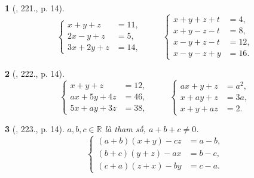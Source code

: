 \documentclass{article}
\newtheorem{baitoan}{}
\begin{document}
\begin{baitoan}[\cite{Binh_Toan_9_tap_2}, 221., p. 14]
	\begin{equation*}
		\left\{\begin{split}
			x + y + z &= 11,\\
			2x - y + z &= 5,\\
			3x + 2y + z &= 14,
		\end{split}\right.\hspace{1cm}\left\{\begin{split}
			x + y + z + t &= 4,\\
			x + y - z - t &= 8,\\
			x - y + z - t &= 12,\\
			x - y - z + y &= 16.
		\end{split}\right.
	\end{equation*}
\end{baitoan}

\begin{baitoan}[\cite{Binh_Toan_9_tap_2}, 222., p. 14]
	\begin{equation*}
		\left\{\begin{split}
			x + y + z &= 12,\\
			ax + 5y + 4z &= 46,\\
			5x + ay + 3z &= 38,
		\end{split}\right.\hspace{1cm}\left\{\begin{split}
			ax + y + z &= a^2,\\
			x + ay + z &= 3a,\\
			x + y + az &= 2.
		\end{split}\right.
	\end{equation*}
\end{baitoan}

\begin{baitoan}[\cite{Binh_Toan_9_tap_2}, 223., p. 14]
	$a,b,c\in\mathbb{R}$ là tham số, $a + b + c\ne0$.
	\begin{equation*}
		\left\{\begin{split}
			(a + b)(x + y) - cz &= a - b,\\
			(b + c)(y + z) - ax &= b - c,\\
			(c + a)(z + x) - by &= c - a.
		\end{split}\right.
	\end{equation*}
\end{baitoan}
\end{document}
